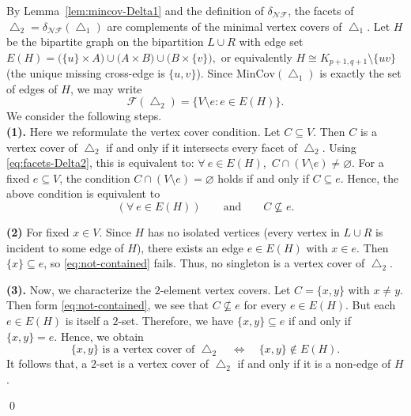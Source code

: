 \documentclass[12pt]{article}
\renewenvironment{proof}{{\noindent\bfseries Proof.}}{\qed}
\theoremstyle{plain}
\theoremstyle{definition}
\newcommand{\F}{\mathcal{F}}
\newcommand{\MIN}{\mathrm{MinCov}}
\begin{document}
		\begin{proof}
			By Lemma~\ref{lem:mincov-Delta1} and the definition of \(\delta_{\mathcal{NF}}\),
			the facets of \(\bigtriangleup_2=\delta_{\mathcal{NF}}(\bigtriangleup_1)\) are complements of the minimal vertex covers of \(\bigtriangleup_1\). Let \(H\) be the bipartite graph on the bipartition \(L\cup R\) with edge set $E(H)=\bigl(\{u\}\times A\bigr) \cup \bigl(A\times B\bigr) \cup \bigl(B\times \{v\}\bigr), $ or equivalently \(H\cong K_{p+1,q+1}\setminus\{uv\}\) (the unique missing cross-edge is \(\{u,v\}\)).
			Since \(\MIN(\bigtriangleup_1)\) is exactly the set of edges of \(H\), we may write
			\begin{equation}\label{eq:facets-Delta2}
				\F(\bigtriangleup_2)=\{ V\setminus e  :  e\in E(H) \}.
			\end{equation}
			We consider the following steps.\\
			\medskip\noindent
			\textbf{(1).} Here we reformulate the vertex cover condition. Let \(C\subseteq V\). Then \(C\) is a vertex cover of \(\bigtriangleup_2\) if and only if it intersects every facet of \(\bigtriangleup_2\). 	Using \eqref{eq:facets-Delta2}, this is equivalent to: $\forall ~e\in E(H),$   $C\cap (V\setminus e)\neq\varnothing.$ 
			For a fixed \(e\subseteq V\), the condition \(C\cap (V\setminus e)=\varnothing\) holds if and only if
			\(C\subseteq e\). Hence, the above condition is equivalent to
			\begin{equation}\label{eq:not-contained}
				(\forall ~e\in E(H))\qquad\text{and}\qquad C\not\subseteq e.
			\end{equation}
			
			\medskip\noindent
			\textbf{(2)}
			For fixed \(x\in V\). Since \(H\) has no isolated vertices (every vertex in \(L\cup R\) is incident to some edge of \(H\)),
			there exists an edge \(e\in E(H)\) with \(x\in e\). Then \(\{x\}\subseteq e\), so \eqref{eq:not-contained} fails.
			Thus, no singleton is a vertex cover of \(\bigtriangleup_2\).
			
			\medskip\noindent
			\textbf{(3).} Now, we characterize the \(2\)-element vertex covers.	Let \(C=\{x,y\}\) with \(x\neq y\). Then form \eqref{eq:not-contained}, we see that \(C\not\subseteq e\) for every \(e\in E(H)\).
			But each \(e\in E(H)\) is itself a \(2\)-set. Therefore, we have
			 $\{x,y\}\subseteq e$  if and only if $ \{x,y\}=e.$ 	Hence, we obtain
			\begin{equation}\label{eq:2cover-iff-nonedge}
				\{x,y\}\text{ is a vertex cover of }\bigtriangleup_2
				\quad\Longleftrightarrow\quad
				\{x,y\}\notin E(H).
			\end{equation}
			It follows that, a \(2\)-set is a vertex cover of \(\bigtriangleup_2\) if and only if it is a non-edge of \(H\).
			

\end{proof}
\end{document}
